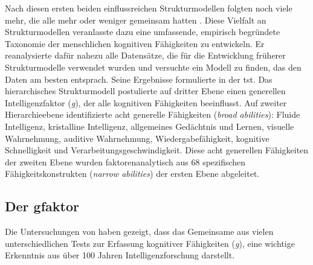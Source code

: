 \documentclass[11pt, twoside, a4paper]{book}		%
\begin{document}

Nach diesen ersten beiden einflussreichen Strukturmodellen folgten noch viele mehr, die alle mehr oder weniger gemeinsam hatten \citep[siehe][]{Vernon1950, Cattell1971, Guilford1977, Jaeger1984}. Diese Vielfalt an Strukturmodellen veranlasste \citet{Carroll1993} dazu eine umfassende, empirisch begründete Taxonomie der menschlichen kognitiven Fähigkeiten zu entwickeln. Er reanalysierte dafür nahezu alle Datensätze, die für die Entwicklung früherer Strukturmodelle verwendet wurden und versuchte ein Modell zu finden, das den Daten am besten entsprach. Seine Ergebnisse formulierte \citeauthor{Carroll1993} in der \gls{tst}. Das hierarchisches Strukturmodell postulierte auf dritter Ebene einen generellen Intelligenzfaktor (\textit{g}), der alle kognitiven Fähigkeiten beeinflusst. Auf zweiter Hierarchieebene identifizierte \citeauthor{Carroll1993} acht generelle Fähigkeiten (\textit{broad abilities}): Fluide Intelligenz, kristalline Intelligenz, allgemeines Gedächtnis und Lernen, visuelle Wahrnehmung, auditive Wahrnehmung, Wiedergabefähigkeit, kognitive Schnelligkeit und Verarbeitungsgeschwindigkeit. Diese acht generellen Fähigkeiten der zweiten Ebene wurden faktorenanalytisch aus 68 spezifischen Fähigkeitskonstrukten (\textit{narrow abilities}) der ersten Ebene abgeleitet. 

\subsection{Der \gls{gfaktor}}

Die Untersuchungen von \citet{Carroll1993} \citep[und deren Erweiterungen im Rahmen des Cattell-Horn-Carroll-Modells, siehe][]{McGrew2005, McGrew2009} haben gezeigt, dass das Gemeinsame aus vielen unterschiedlichen Tests zur Erfassung kognitiver Fähigkeiten (\textit{g}), eine wichtige Erkenntnis aus über 100 Jahren Intelligenzforschung darstellt.
\end{document}
